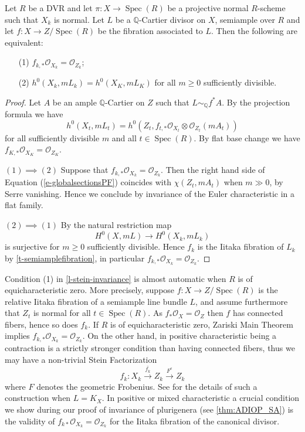 \documentclass[a4paper,12pt]{book}
\DeclareMathOperator{\Spec}{Spec}
\newcommand{\bQ}{\mathbb{Q}}
\newcommand{\cO}{\mathcal{O}}
\begin{document}
	
	\begin{lemma}\label{l-stein-invariance}
		Let $R$ be a DVR and let $\pi \colon X \to \Spec(R)$ be a projective normal $R$-scheme such that $X_k$ is normal. 
		Let $L$ be a $\bQ$-Cartier divisor on $X$, semiample over $R$ and let $f \colon X \to Z / \Spec(R)$ be the  fibration associated to $L$.
		Then the following are equivalent:
		\begin{enumerate}
			\item[(1)] $f_{k,*} \cO_{X_k} = \cO_{Z_k}$;
			\item[(2)] $h^0(X_k, mL_k)=h^0(X_K, mL_K)$ for all $m\geq 0$ sufficiently divisible.
		\end{enumerate}
	\end{lemma}
	
	\begin{proof}
		Let $A$ be an ample $\bQ$-Cartier on $Z$ such that $L \sim_{\bQ}f^*A$. 
		By the projection formula we have 
		\begin{equation}\label{e-globalsectionsPF}
			h^0(X_t,mL_t)=h^0(Z_t,f_{t,\ast}\cO_{X_t}\otimes\cO_{Z_t}(mA_t))
		\end{equation}
		for all sufficiently divisible $m$ and all $t\in \Spec (R)$. By flat base change we have $f_{K,\ast}\cO_{X_K}=\cO_{Z_K}$.
		
		$(1) \implies (2)$ Suppose that $f_{k,\ast}\cO_{X_k}=\cO_{Z_k}$. Then the right hand side of Equation (\ref{e-globalsectionsPF}) coincides with $\chi(Z_t,mA_t)$ when $m\gg 0$, by Serre vanishing. Hence we conclude by invariance of the Euler characteristic in a flat family.
		
		$(2) \implies (1)$ By \cite[Corollary III.12.9]{Ha77} the natural restriction map
		$$H^0(X,mL)\to H^0(X_k,mL_k)$$
		is surjective for $m\geq 0$ sufficiently divisible. Hence $f_k$ is the Iitaka fibration of $L_k$ by \autoref{t-semiamplefibration}, in particular $f_{k,\ast}\cO_{X_k}=\cO_{Z_k}$. 
	\end{proof}
	
	\begin{remark}\label{r-connected fibers v contraction}
	Condition (1) in \autoref{l-stein-invariance} is almost automatic when $R$ is of equicharacteristic zero. More precisely, suppose $f\colon X\to Z/\Spec(R)$ is the relative Iitaka fibration of a semiample line bundle $L$, and assume furthermore that $Z_t$ is normal for all $t\in\Spec(R)$. As $f_*\cO_X=\cO_Z$ then $f$ has connected fibers, hence so does $f_k$. If $R$ is of equicharacteristic zero, Zariski Main Theorem implies $f_{k,*}\cO_{X_k}=\cO_{Z_k}$. On the other hand, in positive characteristic being a contraction is a strictly stronger condition than having connected fibers, thus we may have a non-trivial Stein Factorization
	$$f_k\colon X_k\xrightarrow{\bar{f_k}} Z_k\xrightarrow{F^e}Z_k$$
where $F$ denotes the geometric Frobenius.  
See \cite{Bri20} for the details of such a construction when $L=K_X$.
In positive or mixed characteristic a crucial condition we show during our proof of invariance of plurigenera (see \autoref{thm:ADIOP_SA}) is the validity of $f_{k*} \mathcal{O}_{X_k}=\mathcal{O}_{Z_k}$ for the Iitaka fibration of the canonical divisor.
\end{remark}
	
\end{document}
